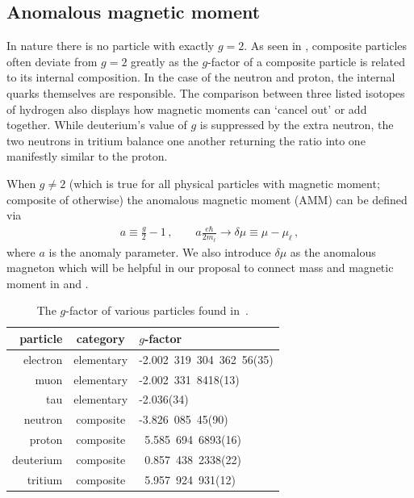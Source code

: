 \subsection{Anomalous magnetic moment}
In nature there is no particle with exactly $g\!=\!2$. As seen in , composite particles often deviate from $g\!=\!2$ greatly as the $g$-factor of a composite particle is related to its internal composition. In the case of the neutron and proton, the internal quarks themselves are responsible. The comparison between three listed isotopes of hydrogen also displays how magnetic moments can `cancel out' or add together. While deuterium's value of $g$ is suppressed by the extra neutron, the two neutrons in tritium balance one another returning the ratio into one manifestly similar to the proton.

When $g\neq2$ (which is true for all physical particles with magnetic moment; composite of otherwise) the anomalous magnetic moment (AMM) can be defined via 
\begin{gather}
    \label{amm:1}
    a\equiv\frac{g}{2}-1\,,\qquad
    a\frac{e\hbar}{2m_{\ell}}\rightarrow\delta\mu\equiv\mu-\mu_{\ell}\,,
\end{gather}
where $a$ is the anomaly parameter. We also introduce $\delta\mu$ as the anomalous magneton which will be helpful in our proposal to connect mass and magnetic moment in  and .

\begin{table}
	\centering
\begin{tabular}{r|c|l}
    particle & category & $g$-factor\\
    \hline
	electron & elementary & -2.002\ 319\ 304\ 362\ 56(35)\\
	muon & elementary & -2.002\ 331\ 8418(13)\\
	tau & elementary & -2.036(34)\\
	neutron & composite & -3.826\ 085\ 45(90)\\
	proton & composite & \ 5.585\ 694\ 6893(16)\\
	deuterium & composite & \ 0.857\ 438\ 2338(22)\\
	tritium & composite & \ 5.957\ 924\ 931(12)\\
\end{tabular}
	\caption{The $g$-factor of various particles found in~\cite{ParticleDataGroup:2022pth}.}
	\label{tab:gfactor}
\end{table}


